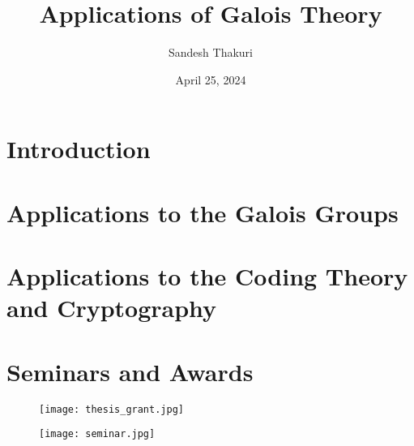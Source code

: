 \documentclass[a4paper,12pt,oneside,onecolumn,openany,final]{memoir}
\title{Applications of Galois Theory}
\author{Sandesh Thakuri}
\date{April 25, 2024}
\begin{document}
\frontmatter











\tableofcontents  %
\listoftables*
\listoffigures*

\mainmatter


\chapter{Introduction}


\chapter{Applications to the Galois Groups}


\chapter{Applications to the Coding Theory and Cryptography}



\backmatter




\chapter*{Seminars and Awards}
\thispagestyle{empty}
\begin{figure}[h]
  \texttt{[image: thesis\_grant.jpg]}
\end{figure}

\vspace{3mm}
\begin{figure}[h]
  \texttt{[image: seminar.jpg]}
\end{figure}
\end{document}
